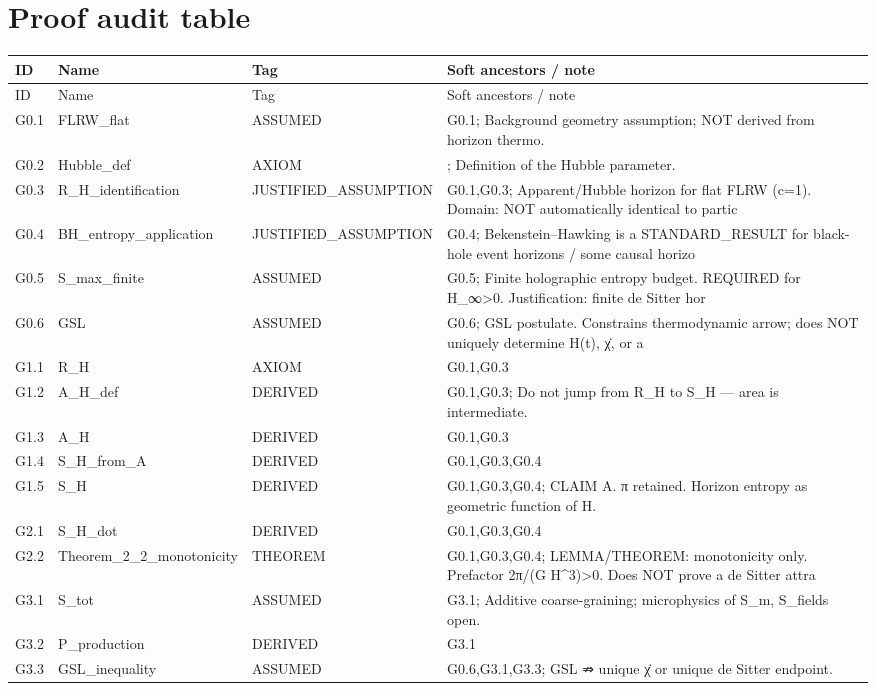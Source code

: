 \documentclass[11pt,a4paper]{article}
\theoremstyle{remark}\newtheorem*{caution}{Caution}
\begin{document}
\section{Proof audit table}
{\small\begin{longtable}{@{}p{2.1cm}p{3.1cm}p{2.6cm}p{6cm}@{}}
\toprule ID & Name & Tag & Soft ancestors / note \\ \midrule
\endfirsthead\toprule ID & Name & Tag & Soft ancestors / note \\ \midrule\endhead
G0.1 & FLRW\_flat & ASSUMED & G0.1; Background geometry assumption; NOT derived from horizon thermo. \\
G0.2 & Hubble\_def & AXIOM & ; Definition of the Hubble parameter. \\
G0.3 & R\_H\_identification & JUSTIFIED\_ASSUMPTION & G0.1,G0.3; Apparent/Hubble horizon for flat FLRW (c=1). Domain: NOT automatically identical to partic \\
G0.4 & BH\_entropy\_application & JUSTIFIED\_ASSUMPTION & G0.4; Bekenstein–Hawking is a STANDARD\_RESULT for black-hole event horizons / some causal horizo \\
G0.5 & S\_max\_finite & ASSUMED & G0.5; Finite holographic entropy budget. REQUIRED for H\_∞>0. Justification: finite de Sitter hor \\
G0.6 & GSL & ASSUMED & G0.6; GSL postulate. Constrains thermodynamic arrow; does NOT uniquely determine H(t), χ̇, or a  \\
G1.1 & R\_H & AXIOM & G0.1,G0.3 \\
G1.2 & A\_H\_def & DERIVED & G0.1,G0.3; Do not jump from R\_H to S\_H — area is intermediate. \\
G1.3 & A\_H & DERIVED & G0.1,G0.3 \\
G1.4 & S\_H\_from\_A & DERIVED & G0.1,G0.3,G0.4 \\
G1.5 & S\_H & DERIVED & G0.1,G0.3,G0.4; CLAIM A. π retained. Horizon entropy as geometric function of H. \\
G2.1 & S\_H\_dot & DERIVED & G0.1,G0.3,G0.4 \\
G2.2 & Theorem\_2\_2\_monotonicity & THEOREM & G0.1,G0.3,G0.4; LEMMA/THEOREM: monotonicity only. Prefactor 2π/(G H^3)>0. Does NOT prove a de Sitter attra \\
G3.1 & S\_tot & ASSUMED & G3.1; Additive coarse-graining; microphysics of S\_m, S\_fields open. \\
G3.2 & P\_production & DERIVED & G3.1 \\
G3.3 & GSL\_inequality & ASSUMED & G0.6,G3.1,G3.3; GSL ⇏ unique χ̇ or unique de Sitter endpoint. \\

\end{longtable}}
\end{document}
